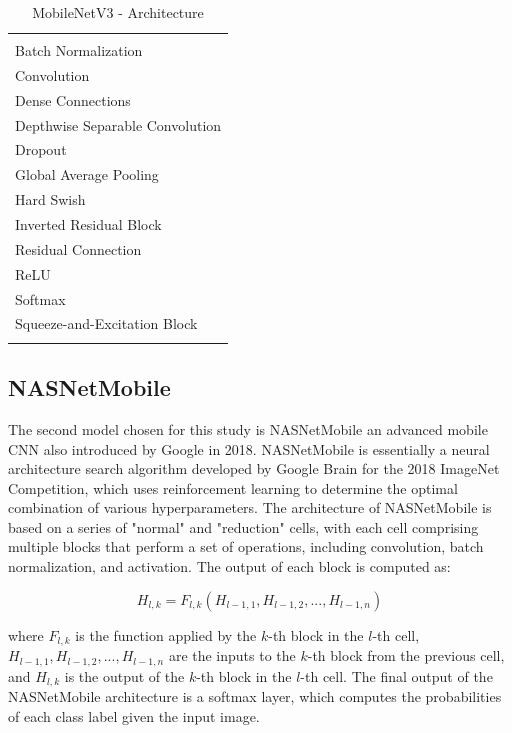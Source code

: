 \documentclass[conference]{IEEEtran}
\begin{document}
\begin{table}[ht]
\centering
\caption{MobileNetV3 - Architecture}
\begin{tabularx}{\columnwidth}{>{\centering\arraybackslash}X}
\hline
\begin{tabular}{c}
1x1 Convolution \\
Batch Normalization \\
Convolution \\
Dense Connections \\
Depthwise Separable Convolution \\
Dropout \\
Global Average Pooling \\
Hard Swish \\
Inverted Residual Block \\
Residual Connection \\
ReLU \\
Softmax \\
Squeeze-and-Excitation Block \\
\end{tabular} \\
\hline
\end{tabularx}
\label{table:MobileNetV3-Architecture}
\end{table}



\subsection{NASNetMobile}
The second model chosen for this study is NASNetMobile an advanced mobile CNN also introduced by Google in 2018. NASNetMobile is essentially a neural architecture search algorithm developed by Google Brain for the 2018 ImageNet Competition, which uses reinforcement learning to determine the optimal combination of various hyperparameters. The architecture of NASNetMobile is based on a series of "normal" and "reduction" cells, with each cell comprising multiple blocks that perform a set of operations, including convolution, batch normalization, and activation. The output of each block is computed as:

\begin{equation}
H_{l,k} = F_{l,k}(H_{l-1,1},H_{l-1,2},...,H_{l-1,n})
\end{equation}

where $F_{l,k}$ is the function applied by the $k$-th block in the $l$-th cell, $H_{l-1,1},H_{l-1,2},...,H_{l-1,n}$ are the inputs to the $k$-th block from the previous cell, and $H_{l,k}$ is the output of the $k$-th block in the $l$-th cell. The final output of the NASNetMobile architecture is a softmax layer, which computes the probabilities of each class label given the input image.
\end{document}

